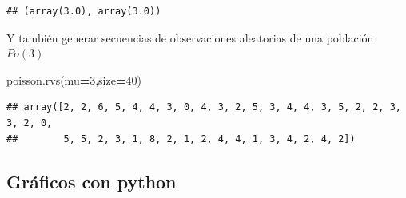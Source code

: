 \documentclass[]{book}
\newenvironment{Shaded}{\begin{snugshade}}{\end{snugshade}}
\newcommand{\DecValTok}[1]{\textcolor[rgb]{0.00,0.00,0.81}{#1}}
\newcommand{\NormalTok}[1]{#1}
\newcommand{\OperatorTok}[1]{\textcolor[rgb]{0.81,0.36,0.00}{\textbf{#1}}}
\begin{document}
\begin{verbatim}
## (array(3.0), array(3.0))
\end{verbatim}

Y también generar secuencias de observaciones aleatorias de una población \(Po(3)\)

\begin{Shaded}
\begin{Highlighting}[]
\NormalTok{poisson.rvs(mu}\OperatorTok{=}\DecValTok{3}\NormalTok{,size}\OperatorTok{=}\DecValTok{40}\NormalTok{)}
\end{Highlighting}
\end{Shaded}

\begin{verbatim}
## array([2, 2, 6, 5, 4, 4, 3, 0, 4, 3, 2, 5, 3, 4, 4, 3, 5, 2, 2, 3, 3, 2, 0,
##        5, 5, 2, 3, 1, 8, 2, 1, 2, 4, 4, 1, 3, 4, 2, 4, 2])
\end{verbatim}

\hypertarget{gruxe1ficos-con-python-2}{%
\subsection{Gráficos con python}\label{gruxe1ficos-con-python-2}}
\end{document}
